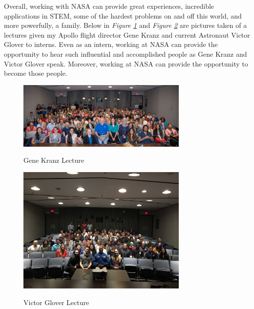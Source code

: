 \documentclass{article}
\begin{document}
Overall, working with NASA can provide great experiences, incredible applications in STEM, some of the hardest problems on and off this world, and more powerfully, a family. Below in \textit{Figure \ref{fig:bigoutreachgroup}} and \textit{Figure \ref{fig:smalleroutreachgroup}} are pictures taken of a lectures given my Apollo flight director Gene Kranz and current Astronaut Victor Glover to interns. Even as an intern, working at NASA can provide the opportunity to hear such influential and accomplished people as Gene Kranz and Victor Glover speak. Moreover, working at NASA can provide the opportunity to become those people.

\begin{figure}[!htb]
  \centering
  \caption{Gene Kranz Lecture}
  \includegraphics[width=0.75\textwidth]{assets/bigoutreachgroup.jpg}
  \label{fig:bigoutreachgroup}
\end{figure}

\begin{figure}[!htb]
  \centering
  \caption{Victor Glover Lecture}
  \includegraphics[width=0.75\textwidth]{assets/smalleroutreachgroup.png}
  \label{fig:smalleroutreachgroup}
\end{figure}
\end{document}
